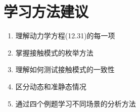 \documentclass[12pt,a4paper]{article}
\begin{document}
\section{学习方法建议}

\begin{enumerate}
    \item 理解动力学方程(12.31)的每一项
    \item 掌握接触模式的枚举方法
    \item 理解如何测试接触模式的一致性
    \item 区分动态和准静态情况
    \item 通过四个例题学习不同场景的分析方法
\end{enumerate}
\end{document}
